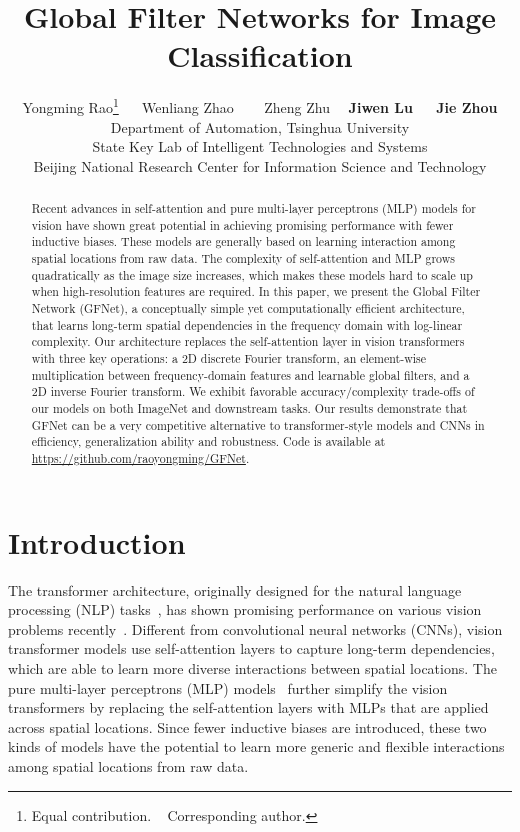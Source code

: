 \documentclass{article}
\title{Global Filter Networks for Image Classification}
\author{
Yongming Rao\thanks{Equal contribution. ~ \textsuperscript{\dag}Corresponding author.}
~~
Wenliang Zhao\samethanks 
~~~
Zheng Zhu~~
\textbf{Jiwen Lu}\textsuperscript{\dag}
~~
\textbf{Jie Zhou}
\\ [0.25cm]
Department of Automation, Tsinghua University \\
State Key Lab of Intelligent Technologies and Systems \\
Beijing National Research Center for Information Science and Technology \\
}
\numberwithin{equation}{section}
\begin{document}
\maketitle

\begin{abstract}
  Recent advances in self-attention and pure multi-layer perceptrons (MLP) models for vision have shown great potential in achieving promising performance with fewer inductive biases. These models are generally based on learning interaction among spatial locations from raw data. The complexity of self-attention and MLP grows quadratically as the image size increases, which makes these models hard to scale up when high-resolution features are required. In this paper, we present the Global Filter Network (GFNet), a conceptually simple yet computationally efficient architecture, that learns long-term spatial dependencies in the frequency domain with log-linear complexity. Our architecture replaces the self-attention layer in vision transformers with three key operations: a 2D discrete Fourier transform, an element-wise multiplication between frequency-domain features and learnable global filters, and a 2D inverse Fourier transform. We exhibit favorable accuracy/complexity trade-offs of our models on both ImageNet and downstream tasks. Our results demonstrate that GFNet can be a very competitive alternative to transformer-style models and CNNs in efficiency, generalization ability and robustness. Code is available at \url{https://github.com/raoyongming/GFNet}.
\end{abstract}

\section{Introduction}


The transformer architecture, originally designed for the natural language processing (NLP) tasks~\cite{transformer}, has shown promising performance on various vision problems recently~\cite{dosovitskiy2020vit, touvron2020deit, liu2021swin, setr, TransTracking,yu2021pointr,rao2021dynamicvit,cheng2021maskformer}. Different from convolutional neural networks (CNNs), vision transformer models use self-attention layers to capture long-term dependencies, which are able to learn more diverse interactions between spatial locations. The pure multi-layer perceptrons (MLP) models~\cite{tolstikhin2021mlp, touvron2021resmlp} further simplify the vision transformers by replacing the self-attention layers with MLPs that are applied across spatial locations. Since fewer inductive biases are introduced, these two kinds of models have the potential to learn more generic and flexible interactions among spatial locations from raw data.
\end{document}
